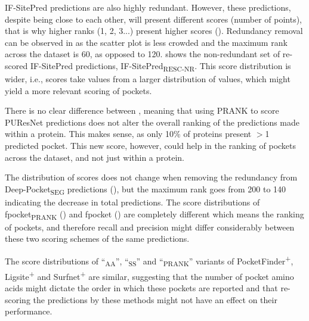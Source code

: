 IF-SitePred predictions are also highly redundant. However, these predictions, despite being close to each other, will present different scores (number of points), that is why higher ranks (1, 2, 3...) present higher scores (). Redundancy removal can be observed in  as the scatter plot is less crowded and the maximum rank across the dataset is 60, as opposed to 120.  shows the non-redundant set of re-scored IF-SitePred predictions, IF-SitePred\textsubscript{RESC-NR}. This score distribution is wider, i.e., scores take values from a larger distribution of values, which might yield a more relevant scoring of pockets.

There is no clear difference between , meaning that using PRANK to score PUResNet predictions does not alter the overall ranking of the predictions made within a protein. This makes sense, as only 10\% of proteins present $>$1 predicted pocket. This new score, however, could help in the ranking of pockets across the dataset, and not just within a protein.

The distribution of scores does not change when removing the redundancy from Deep-Pocket\textsubscript{SEG} predictions (), but the maximum rank goes from 200 to 140 indicating the decrease in total predictions. The score distributions of fpocket\textsubscript{PRANK} () and fpocket () are completely different which means the ranking of pockets, and therefore recall and precision might differ considerably between these two scoring schemes of the same predictions.

The score distributions of ``\textsubscript{AA}'', ``\textsubscript{SS}'' and ``\textsubscript{PRANK}'' variants of PocketFinder\textsuperscript{+}, Ligsite\textsuperscript{+} and Surfnet\textsuperscript{+} are similar, suggesting that the number of pocket amino acids might dictate the order in which these pockets are reported  and that re-scoring the predictions by these methods might not have an effect on their performance.

